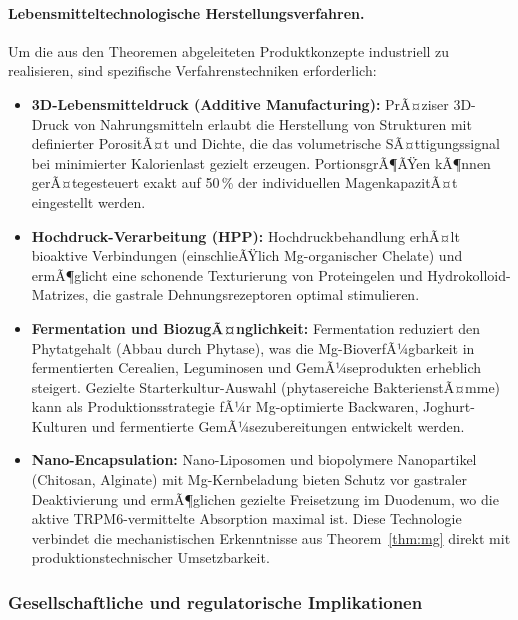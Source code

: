 ﻿\documentclass[12pt,a4paper]{article}
\theoremstyle{plain}
\theoremstyle{definition}
\theoremstyle{remark}
\begin{document}
\paragraph{Lebensmitteltechnologische Herstellungsverfahren.}
Um die aus den Theoremen abgeleiteten Produktkonzepte industriell zu
realisieren, sind spezifische Verfahrenstechniken erforderlich:
\begin{itemize}
  \item \textbf{3D-Lebensmitteldruck (Additive Manufacturing):}
        PrÃ¤ziser 3D-Druck von Nahrungsmitteln erlaubt die Herstellung
        von Strukturen mit definierter PorositÃ¤t und Dichte, die
        das volumetrische SÃ¤ttigungssignal bei minimierter Kalorienlast
        gezielt erzeugen. PortionsgrÃ¶ÃŸen kÃ¶nnen gerÃ¤tegesteuert exakt
        auf 50\,\% der individuellen MagenkapazitÃ¤t eingestellt werden.
  \item \textbf{Hochdruck-Verarbeitung (HPP):}
        Hochdruckbehandlung erhÃ¤lt bioaktive Verbindungen (einschlieÃŸlich
        Mg-organischer Chelate) und ermÃ¶glicht eine schonende Texturierung
        von Proteingelen und Hydrokolloid-Matrizes, die gastrale
        Dehnungsrezeptoren optimal stimulieren.
  \item \textbf{Fermentation und BiozugÃ¤nglichkeit:}
        Fermentation reduziert den Phytatgehalt (Abbau durch Phytase),
        was die Mg-BioverfÃ¼gbarkeit in fermentierten Cerealien, Leguminosen
        und GemÃ¼seprodukten erheblich steigert. Gezielte Starterkultur-Auswahl
        (phytasereiche BakterienstÃ¤mme) kann als Produktionsstrategie fÃ¼r
        Mg-optimierte Backwaren, Joghurt-Kulturen und fermentierte
        GemÃ¼sezubereitungen entwickelt werden.
  \item \textbf{Nano-Encapsulation:}
        Nano-Liposomen und biopolymere Nanopartikel (Chitosan, Alginate)
        mit Mg-Kernbeladung bieten Schutz vor gastraler Deaktivierung und
        ermÃ¶glichen gezielte Freisetzung im Duodenum, wo die aktive
        TRPM6-vermittelte Absorption maximal ist. Diese Technologie
        verbindet die mechanistischen Erkenntnisse aus Theorem~\ref{thm:mg}
        direkt mit produktionstechnischer Umsetzbarkeit.
\end{itemize}

\subsubsection{Gesellschaftliche und regulatorische Implikationen}
\end{document}
